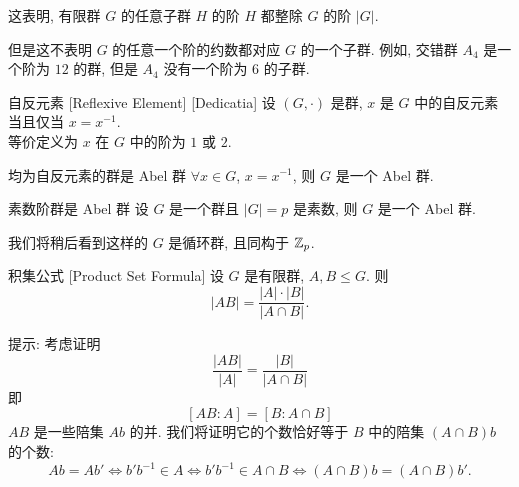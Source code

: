         \begin{rmk}
            这表明, 有限群 \(G\) 的任意子群 \(H\) 的阶 \(H\) 都整除 \(G\) 的阶 \(|G|\). 
        \end{rmk}

        \begin{rmk}
            但是这不表明 \(G\) 的任意一个阶的约数都对应 \(G\) 的一个子群. 例如, 交错群 \(A_4\) 是一个阶为 \(12\) 的群, 但是 \(A_4\) 没有一个阶为 \(6\) 的子群.
        \end{rmk}

        \begin{dfn}
            {自反元素}
            [Reflexive Element]
            [Dedicatia]
            设 \((G,\cdot)\) 是群, \(x\) 是 \(G\) 中的自反元素当且仅当 \(x=x^{-1}\).\\
            等价定义为 \(x\) 在 \(G\) 中的阶为 \(1\) 或 \(2\).
        \end{dfn}

        \begin{crl}
            {均为自反元素的群是 Abel 群}
            \(\forall x\in G\), \(x=x^{-1}\), 则 \(G\) 是一个 Abel 群.
        \end{crl}

        \begin{crl}
            {素数阶群是 Abel 群}
            设 \(G\) 是一个群且 \(|G|=p\) 是素数, 则 \(G\) 是一个 Abel 群. 
        \end{crl}

        \begin{rmk}
            我们将稍后看到这样的 \(G\) 是循环群, 且同构于 \(\operatorname{\mathbb{Z}}_p\).
        \end{rmk}

        \begin{thm}
            {积集公式}
            [Product Set Formula]
            设 \(G\) 是有限群, \(A,B\leq G\). 则
            \[|AB|=\frac{|A|\cdot|B|}{|A\cap B|}.\]
        \end{thm}

        \begin{prf}
            提示: 考虑证明 
            \[\frac{|AB|}{|A|}=\frac{|B|}{|A\cap B|}\]
            即
            \[[AB: A]=[B: A\cap B]\]
            \(AB\) 是一些陪集 \(Ab\) 的并. 我们将证明它的个数恰好等于 \(B\) 中的陪集 \((A\cap B)b\) 的个数:
            \[Ab=Ab' \Longleftrightarrow b'b^{-1}\in A\Longleftrightarrow b'b^{-1}\in A\cap B\Longleftrightarrow (A\cap B)b=(A\cap B)b'.\]
        \end{prf}

